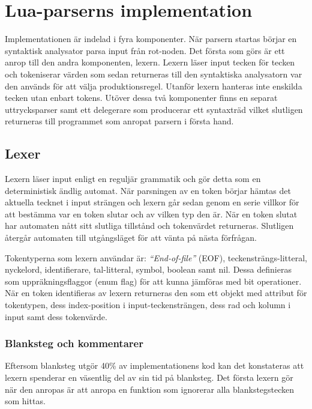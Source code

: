 \section{Lua-parserns implementation}

Implementationen är indelad i fyra komponenter. När parsern startas börjar
en syntaktisk analysator parsa input från rot-noden.  Det första som görs är
ett anrop till den andra komponenten, lexern. Lexern läser input tecken för
tecken och tokeniserar värden som sedan returneras till den syntaktiska
analysatorn var den används för att välja produktionsregel. Utanför lexern
hanteras inte enskilda tecken utan enbart tokens.  Utöver dessa två
komponenter finns en separat uttrycksparser samt ett delegerare som producerar
ett syntaxträd vilket slutligen returneras till programmet som anropat parsern
i första hand.

\subsection{Lexer}

Lexern läser input enligt en reguljär grammatik och gör detta som en
deterministisk ändlig automat. När parsningen av en token börjar hämtas det
aktuella tecknet i input strängen och lexern går sedan genom en serie villkor
för att bestämma var en token slutar och av vilken typ den är. När en token
slutat har automaten nått sitt slutliga tillstånd och tokenvärdet returneras.
Slutligen återgår automaten till utgångsläget för att vänta på nästa
förfrågan.

Tokentyperna som lexern användar är: \textit{``End-of-file''} (EOF),
teckensträngs-litteral, nyckelord, identifierare, tal-litteral, symbol,
boolean samt nil. Dessa definieras som uppräkningsflaggor (enum flag) för att
kunna jämföras med bit operationer. När en token identifieras av lexern
returneras den som ett objekt med attribut för tokentypen, dess index-position
i input-teckensträngen, dess rad och kolumn i input samt dess tokenvärde.

\subsubsection{Blanksteg och kommentarer}

Eftersom blanksteg utgör 40\% av implementationens kod kan det konstateras att
lexern spenderar en väsentlig del av sin tid på blanksteg. Det första lexern
gör när den anropas är att anropa en funktion som ignorerar alla
blankstegstecken som hittas.


